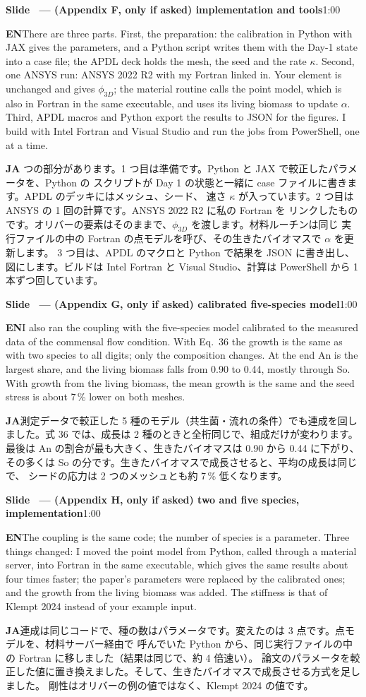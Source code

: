 \documentclass[11pt,a4paper]{article}
\newcounter{sl}
\newcommand{\slide}[2]{\stepcounter{sl}\vspace{8pt}%
  {\color{c3}\large\bfseries Slide \thesl\ --- #1}\hfill{\small #2}\par\vspace{2pt}}
\newcommand{\EN}{\textbf{EN}\quad}
\newcommand{\JA}{\par\textbf{JA}\quad}
\begin{document}
\slide{(Appendix F, only if asked) implementation and tools}{1:00}
\EN There are three parts. First, the preparation: the calibration in Python
with JAX gives the parameters, and a Python script writes them with the
Day-1 state into a case file; the APDL deck holds the mesh, the seed and the
rate $\kappa$. Second, one ANSYS run: ANSYS 2022 R2 with my Fortran linked in.
Your element is unchanged and gives $\phi_{3D}$; the material routine calls
the point model, which is also in Fortran in the same executable, and uses
its living biomass to update $\alpha$. Third, APDL macros and Python export
the results to JSON for the figures. I build with Intel Fortran and Visual
Studio and run the jobs from PowerShell, one at a time.
\JA 3 つの部分があります。1 つ目は準備です。Python と JAX で較正したパラメータを、Python の
スクリプトが Day 1 の状態と一緒に case ファイルに書きます。APDL のデッキにはメッシュ、シード、
速さ $\kappa$ が入っています。2 つ目は ANSYS の 1 回の計算です。ANSYS 2022 R2 に私の Fortran を
リンクしたものです。オリバーの要素はそのままで、$\phi_{3D}$ を渡します。材料ルーチンは同じ
実行ファイルの中の Fortran の点モデルを呼び、その生きたバイオマスで $\alpha$ を更新します。
3 つ目は、APDL のマクロと Python で結果を JSON に書き出し、図にします。ビルドは Intel Fortran と
Visual Studio、計算は PowerShell から 1 本ずつ回しています。

\slide{(Appendix G, only if asked) calibrated five-species model}{1:00}
\EN I also ran the coupling with the five-species model calibrated to the
measured data of the commensal flow condition. With Eq.\ 36 the growth is the
same as with two species to all digits; only the composition changes. At the
end An is the largest share, and the living biomass falls from 0.90 to 0.44,
mostly through So. With growth from the living biomass, the mean growth is
the same and the seed stress is about 7\,\% lower on both meshes.
\JA 測定データで較正した 5 種のモデル（共生菌・流れの条件）でも連成を回しました。式 36 では、成長は
2 種のときと全桁同じで、組成だけが変わります。最後は An の割合が最も大きく、生きたバイオマスは
0.90 から 0.44 に下がり、その多くは So の分です。生きたバイオマスで成長させると、平均の成長は同じで、
シードの応力は 2 つのメッシュとも約 7\,\% 低くなります。

\slide{(Appendix H, only if asked) two and five species, implementation}{1:00}
\EN The coupling is the same code; the number of species is a parameter.
Three things changed: I moved the point model from Python, called through a
material server, into Fortran in the same executable, which gives the same
results about four times faster; the paper's parameters were replaced by the
calibrated ones; and the growth from the living biomass was added. The
stiffness is that of Klempt 2024 instead of your example input.
\JA 連成は同じコードで、種の数はパラメータです。変えたのは 3 点です。点モデルを、材料サーバー経由で
呼んでいた Python から、同じ実行ファイルの中の Fortran に移しました（結果は同じで、約 4 倍速い）。
論文のパラメータを較正した値に置き換えました。そして、生きたバイオマスで成長させる方式を足しました。
剛性はオリバーの例の値ではなく、Klempt 2024 の値です。
\end{document}
